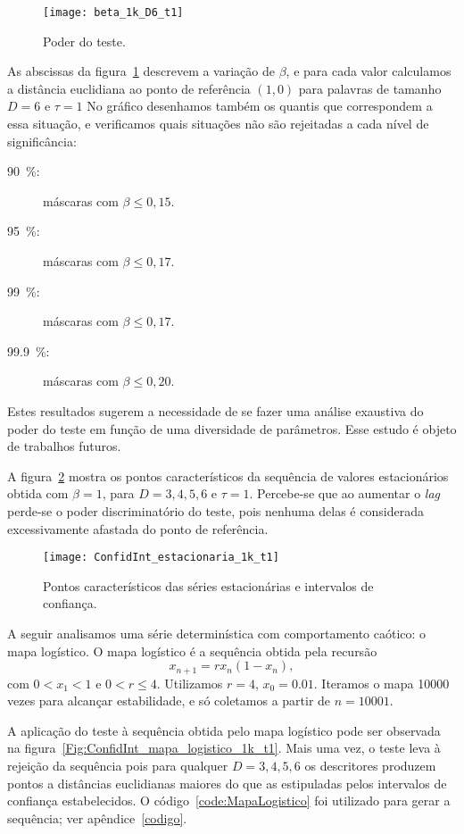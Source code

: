 \begin{figure}
	\centering
	\texttt{[image: beta\_1k\_D6\_t1]}
	\caption{Poder do teste.}\label{Fig:beta}
\end{figure}

As abscissas da figura~\ref{Fig:beta} descrevem a variação de $\beta$, e para cada valor calculamos a distância euclidiana ao ponto de referência $(1,0)$ para palavras de tamanho $D=6$ e $\tau=1$
No gráfico desenhamos também os quantis que correspondem a essa situação, e verificamos quais situações não são rejeitadas a cada nível de significância:
\begin{description}
\item[\SI{90}{\percent}:] máscaras com $\beta\leq 0,15$.
\item[\SI{95}{\percent}:] máscaras com $\beta\leq 0,17$.
\item[\SI{99}{\percent}:] máscaras com $\beta\leq 0,17$.
\item[\SI{99,9}{\percent}:] máscaras com $\beta\leq 0,20$.
\end{description}

Estes resultados sugerem a necessidade de se fazer uma análise exaustiva do poder do teste em função de uma diversidade de parâmetros.
Esse estudo é objeto de trabalhos futuros.

A figura~\ref{Fig:ConfidInt_estacionaria_1k_t1} mostra os pontos característicos da sequência de valores estacionários obtida com $\beta=1$, para $D=3,4,5,6$ e $\tau=1$.
Percebe-se que ao aumentar o \textit{lag} perde-se o poder discriminatório do teste, pois nenhuma delas é considerada excessivamente afastada do ponto de referência.

\begin{figure}
	\centering
	\texttt{[image: ConfidInt\_estacionaria\_1k\_t1]}
	\caption{Pontos característicos das séries estacionárias e intervalos de confiança.}\label{Fig:ConfidInt_estacionaria_1k_t1}
\end{figure}

A seguir analisamos uma série determinística com comportamento caótico: o mapa logístico.
O mapa logístico é a sequência obtida pela recursão
\begin{equation}
x_{n+1} = r x_n(1-x_n),
\end{equation}
com $0<x_1<1$ e $0<r\leq 4$.
Utilizamos $r=4$, $x_0=0.01$.
Iteramos o mapa \num{10000} vezes para alcançar estabilidade, e só coletamos a partir de $n=10001$.

A aplicação do teste à sequência obtida pelo
mapa logístico pode ser observada na figura~\ref{Fig:ConfidInt_mapa_logistico_1k_t1}.
Mais uma vez, o teste leva à rejeição da sequência pois para qualquer $D= 3, 4, 5, 6$ os descritores produzem pontos a distâncias euclidianas maiores do que as estipuladas pelos intervalos de confiança estabelecidos. 
O código~\ref{code:MapaLogistico} foi utilizado para gerar a sequência; ver apêndice~\ref{codigo}.

